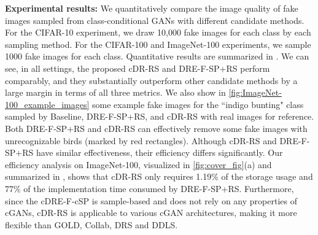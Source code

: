 \documentclass[final,12pt, 3p,times]{elsarticle}
\begin{document}
{\setlength{\parindent}{0cm}\textbf{Experimental results:}} We quantitatively compare the image quality of fake images sampled from class-conditional GANs with different candidate methods. For the CIFAR-10 experiment, we draw 10,000 fake images for each class by each sampling method. For the CIFAR-100 and ImageNet-100 experiments, we sample 1000 fake images for each class. Quantitative results are summarized in . We can see, in all settings, the proposed cDR-RS and DRE-F-SP+RS perform comparably, and they substantially outperform other candidate methods by a large margin in terms of all three metrics. We also show in \cref{fig:ImageNet-100_example_images} some example fake images for the ``indigo bunting" class sampled by Baseline, DRE-F-SP+RS, and cDR-RS with real images for reference. Both DRE-F-SP+RS and cDR-RS can effectively remove some fake images with unrecognizable birds (marked by red rectangles). Although cDR-RS and DRE-F-SP+RS have similar effectiveness, their efficiency differs significantly. Our efficiency analysis on ImageNet-100, visualized in \cref{fig:cover_fig}(a) and summarized in  , shows that cDR-RS only requires 1.19\% of the storage usage and 77\% of the implementation time consumed by DRE-F-SP+RS. Furthermore, since the cDRE-F-cSP is sample-based and does not rely on any properties of cGANs, cDR-RS is applicable to various cGAN architectures, making it more flexible than GOLD, Collab, DRS and DDLS. 
\end{document}
